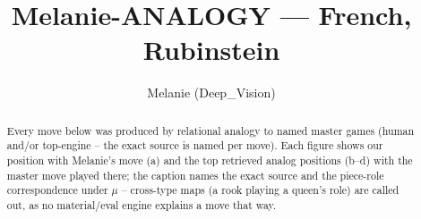 \documentclass[11pt]{article}
\title{Melanie-ANALOGY — French, Rubinstein}
\author{Melanie (Deep\_Vision)}
\date{}
\begin{document}
\maketitle

\begin{abstract}Every move below was produced by relational analogy to named master games (human and/or top-engine -- the exact source is named per move). Each figure shows our position with Melanie's move (a) and the top retrieved analog positions (b--d) with the master move played there; the caption names the exact source and the piece-role correspondence under $\mu$ -- cross-type maps (a rook playing a queen's role) are called out, as no material/eval engine explains a move that way.\end{abstract}

\begin{figure}[p]\centering
\begin{subfigure}{0.46\textwidth}\centering
\resizebox{\linewidth}{!}{%
\newchessgame
\chessboard[
  setfen={r1bqkb1r/ppp2ppp/4pn2/8/3P3P/5N2/PPP2PP1/R1BQKB1R b KQkq - 0 7},
  showmover=false,
  pgfstyle=straightmove, color=movearrow, markmove={c7-c5}
]}
\caption{}
\end{subfigure}\hfill
\begin{subfigure}{0.46\textwidth}\centering
\resizebox{\linewidth}{!}{%
\newchessgame
\chessboard[
  setfen={r1bqkb1r/ppp2ppp/4pn2/8/3P4/3B1N2/PPP2PPP/R1BQK2R b KQkq - 1 7},
  showmover=false,
  pgfstyle=straightmove, color=movearrow, markmove={c7-c5}
]}
\caption{}
\end{subfigure}
\\[4pt]
\begin{subfigure}{0.46\textwidth}\centering
\resizebox{\linewidth}{!}{%
\newchessgame
\chessboard[
  setfen={r1bqkb1r/ppp2ppp/4pn2/8/3P4/3B1N2/PPP2PPP/R1BQK2R b KQkq - 1 7},
  showmover=false,
  pgfstyle=straightmove, color=movearrow, markmove={c7-c5}
]}
\caption{}
\end{subfigure}\hfill
\begin{subfigure}{0.46\textwidth}\centering
\resizebox{\linewidth}{!}{%
\newchessgame
\chessboard[
  setfen={r1bqkb1r/ppp2ppp/4pn2/8/3P4/3B1N2/PPP2PPP/R1BQK2R b KQkq - 1 7},
  showmover=false,
  pgfstyle=straightmove, color=movearrow, markmove={c7-c5}
]}
\caption{}
\end{subfigure}

\end{figure}
\end{document}
